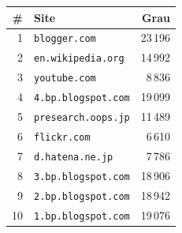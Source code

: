 \begin{tabular}{rlr}
\hline
\# & \textbf{Site} & \textbf{Grau} \\ \hline
1 & \texttt{blogger.com} & 23\,196 \\
2 & \texttt{en.wikipedia.org} & 14\,992 \\
3 & \texttt{youtube.com} & 8\,836 \\
4 & \texttt{4.bp.blogspot.com} & 19\,099 \\
5 & \texttt{presearch.oops.jp} & 11\,489 \\
6 & \texttt{flickr.com} & 6\,610 \\
7 & \texttt{d.hatena.ne.jp} & 7\,786 \\
8 & \texttt{3.bp.blogspot.com} & 18\,906 \\
9 & \texttt{2.bp.blogspot.com} & 18\,942 \\
10 & \texttt{1.bp.blogspot.com} & 19\,076 \\
\hline
\end{tabular}
